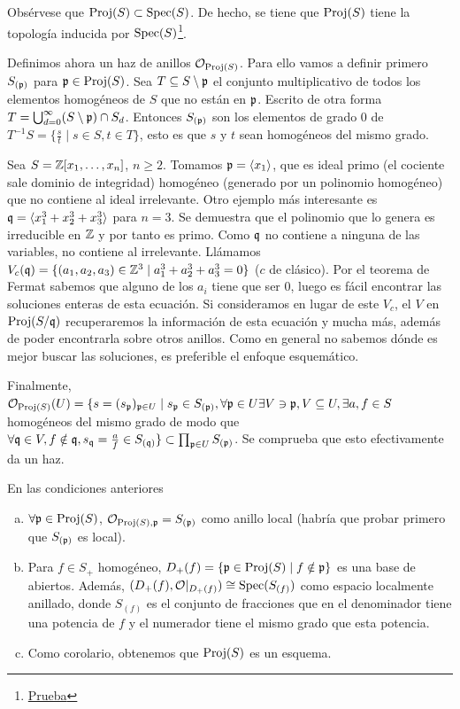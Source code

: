 \documentclass[GA.tex]{subfiles}
\begin{document}
Obsérvese que $\operatorname{Proj}(S)\subset\operatorname{Spec}(S)$. De hecho, se tiene que $\operatorname{Proj}(S)$ tiene la topología inducida por $\operatorname{Spec}(S)$\footnote{\href{https://math.stackexchange.com/questions/2747367/is-the-zariski-topology-of-proj-s-the-same-as-the-subspace-topology-of-spec-s}{Prueba}}.

Definimos ahora un haz de anillos ${\mathcal O}_{\operatorname{Proj}(S)}$. Para ello vamos a definir primero $S_{({\mathfrak{p}})}$ para ${\mathfrak{p}}\in\operatorname{Proj}(S)$. Sea $T\subseteq S\setminus{\mathfrak{p}}$ el conjunto multiplicativo de todos los elementos homogéneos de $S$ que no están en ${\mathfrak{p}}$. Escrito de otra forma $T=\bigcup_{d=0}^{\infty}(S\setminus{\mathfrak{p}})\cap S_d$. Entonces $S_{({\mathfrak{p}})}$ son los elementos de grado 0 de $T^{-1}S=\{\frac{s}{t}\mid s\in S, t\in T\}$, esto es que $s$ y $t$ sean homogéneos del mismo grado.

\begin{ej}
Sea $S=\mathbb{Z}[x_1,\dots, x_n]$, $n\geq 2$. Tomamos ${\mathfrak{p}}=\langle{x_1}\rangle$, que es ideal primo (el cociente sale dominio de integridad) homogéneo (generado por un polinomio homogéneo) que no contiene al ideal irrelevante. Otro ejemplo más interesante es ${\mathfrak{q}}=\langle{x_1^3+x_2^3+x_3^3}\rangle$ para $n=3$. Se demuestra que el polinomio que lo genera es irreducible en $\mathbb{Z}$ y por tanto es primo. Como ${\mathfrak{q}}$ no contiene a ninguna de las variables, no contiene al irrelevante. Llámamos $V_c({\mathfrak{q}})=\{(a_1, a_2,a_3)\in\mathbb{Z}^3\mid a_1^3+a_2^3+a_3^3=0\}$ ($c$ de clásico). Por el teorema de Fermat sabemos que alguno de los $a_i$ tiene que ser 0, luego es fácil encontrar las soluciones enteras de esta ecuación. Si consideramos en lugar de este $V_c$, el $V$ en $\operatorname{Proj}(S/{\mathfrak{q}})$ recuperaremos la información de esta ecuación y mucha más, además de poder encontrarla sobre otros anillos. Como en general no sabemos dónde es mejor buscar las soluciones, es preferible el enfoque esquemático. 
\end{ej} 

Finalmente, ${\mathcal O}_{\operatorname{Proj}(S)}(U)=\{s=(s_{{\mathfrak{p}}})_{{\mathfrak{p}}\in U}\mid s_{{\mathfrak{p}}}\in S_{({\mathfrak{p}})}, \forall {\mathfrak{p}}\in U\exists V\ni{\mathfrak{p}},V\subseteq U, \exists a,f\in S$ homogéneos del mismo grado de modo que $\forall{\mathfrak{q}}\in V, f\notin{\mathfrak{q}}, s_{{\mathfrak{q}}}=\frac{a}{f}\in S_{({\mathfrak{q}})}\}\subset\prod_{{\mathfrak{p}}\in U} S_{({\mathfrak{p}})}$. Se comprueba que esto efectivamente da un haz.  

\begin{prop}
En las condiciones anteriores
\begin{enumerate}[(a)]
\item $\forall{\mathfrak{p}}\in\operatorname{Proj}(S)$, ${\mathcal O}_{\operatorname{Proj}(S),{\mathfrak{p}}}=S_{({\mathfrak{p}})}$ como anillo local (habría que probar primero que $S_{({\mathfrak{p}})}$ es local).
\item Para $f\in S_+$ homogéneo, $D_+(f)=\{{\mathfrak{p}}\in\operatorname{Proj}(S)\mid f\notin{\mathfrak{p}}\}$ es una base de abiertos. Además, $(D_+(f),{\mathcal O}|_{D_+(f)})\cong\operatorname{Spec}(S_{(f)})$ como espacio localmente anillado, donde $S_{(f)}$ es el conjunto de fracciones que en el denominador tiene una potencia de $f$ y el numerador tiene el mismo grado que esta potencia.
\item Como corolario, obtenemos que $\operatorname{Proj}(S)$ es un esquema. 
\end{enumerate}
\end{prop}
\end{document}
